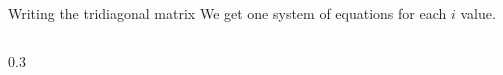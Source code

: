\documentclass{beamer}
\begin{document}
\begin{frame}{Writing the tridiagonal matrix}
    \vspace{-0.8cm}   
    We get one system of equations for each $i$ value.
    
    \begin{columns}
        \begin{column}{0.3\textwidth}
            \begin{minipage}{0.48\textwidth}
\end{minipage}
\end{column}
\end{columns}
\end{frame}
\end{document}
